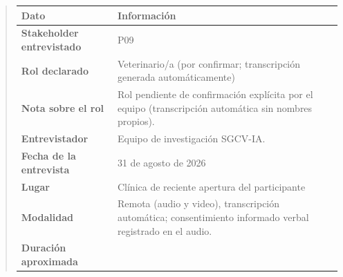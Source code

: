 \documentclass[
]{article}
\newcounter{none} %
\begin{document}
\begin{quote}
{\def\LTcaptype{none} %
\begin{longtable}[]{|
  >{\raggedright\arraybackslash}p{}|
  >{\raggedright\arraybackslash}p{}|}
\hline
\begin{minipage}[b]{\linewidth}\centering
\textbf{Dato}
\end{minipage} & \begin{minipage}[b]{\linewidth}\centering
\textbf{Información}
\end{minipage} \\
\hline
\endhead
\hline
\endlastfoot
\textbf{Stakeholder entrevistado} & \begin{minipage}[t]{\linewidth}\raggedright
P09
\end{minipage} \\
\hline
\textbf{Rol declarado} & \begin{minipage}[t]{\linewidth}\raggedright
Veterinario/a (por confirmar; transcripción generada automáticamente)
\end{minipage} \\
\hline
\textbf{Nota sobre el rol} & \begin{minipage}[t]{\linewidth}\raggedright
Rol pendiente de confirmación explícita por el equipo (transcripción automática sin nombres propios).
\end{minipage} \\
\hline
\textbf{Entrevistador} & \begin{minipage}[t]{\linewidth}\raggedright
Equipo de investigación SGCV-IA.
\end{minipage} \\
\hline
\textbf{Fecha de la entrevista} & \begin{minipage}[t]{\linewidth}\raggedright
31 de agosto de 2026
\end{minipage} \\
\hline
\textbf{Lugar} & \begin{minipage}[t]{\linewidth}\raggedright
Clínica de reciente apertura del participante
\end{minipage} \\
\hline
\textbf{Modalidad} & \begin{minipage}[t]{\linewidth}\raggedright
Remota (audio y video), transcripción automática; consentimiento informado verbal registrado en el audio.
\end{minipage} \\
\hline
\textbf{Duración aproximada} & \begin{minipage}[t]{\linewidth}\raggedright

\end{minipage}
\end{longtable}}
\end{quote}
\end{document}
